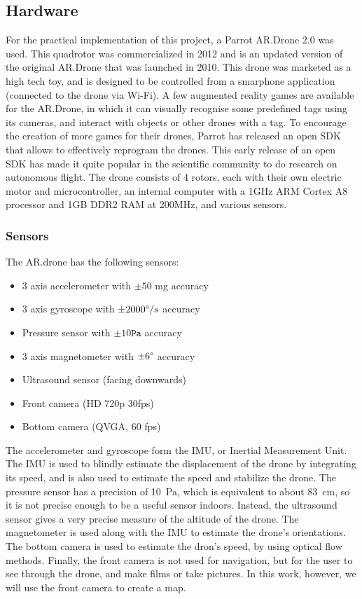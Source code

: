 \subsection{Hardware}
For the practical implementation of this project, a Parrot AR.Drone 2.0 was used. This quadrotor was commercialized in 2012 and is an updated version of the original AR.Drone that was launched in 2010. This drone was marketed as a high tech toy, and is designed to be controlled from a smarphone application (connected to the drone via Wi-Fi). A few augmented reality games are available for the AR.Drone, in which it can visually recognise some predefined tags using its cameras, and interact with objects or other drones with a tag. To encourage the creation of more games for their drones, Parrot has released an open SDK that allows to effectively reprogram the drones. This early release of an open SDK has made it quite popular in the scientific community to do research on autonomous flight. The drone consists of 4 rotors, each with their own electric motor and microcontroller, an internal computer with a 1GHz ARM Cortex A8 processor and 1GB DDR2 RAM at 200MHz, and various sensors.

\subsubsection{Sensors}
The AR.drone has the following sensors:
\begin{itemize}
  \item 3 axis accelerometer with $\pm 50$ mg accuracy
  \item 3 axis gyroscope with $\pm 2000\degree/s$ accuracy
  \item Pressure sensor with $\pm 10 \texttt{Pa}$ accuracy
  \item 3 axis magnetometer with $\pm 6\degree$ accuracy
  \item Ultrasound sensor (facing downwards)
  \item Front camera (HD 720p 30fps)
  \item Bottom camera (QVGA, 60 fps)
\end{itemize}

The accelerometer and gyroscope form the IMU, or Inertial Measurement Unit. The IMU is used to blindly estimate the displacement of the drone by integrating its speed, and is also used to estimate the speed and stabilize the drone. The pressure sensor has a precision of \SI{10}{\pascal}, which is equivalent to about \SI{83}{\centi\metre}, so it is not precise enough to be a useful sensor indoors. Instead, the ultrasound sensor gives a very precise measure of the altitude of the drone. The magnetometer is used along with the IMU to estimate the drone's orientations. The bottom camera is used to estimate the dron's speed, by using optical flow methods. Finally, the front camera is not used for navigation, but for the user to see through the drone, and make films or take pictures. In this work, however, we will use the front camera to create a map.


